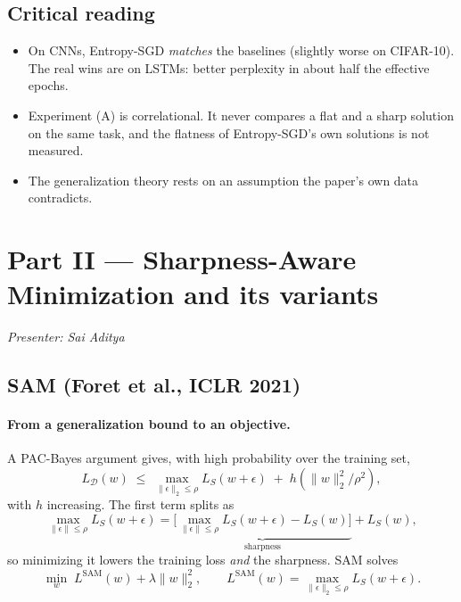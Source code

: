 \documentclass[11pt]{article}
\newcommand{\Ls}{L_S}                    %
\newcommand{\Ld}{L_{\mathcal{D}}}        %
\newcommand{\presenter}[1]{\noindent\textit{Presenter: #1}\par\medskip}
\theoremstyle{plain}
\begin{document}
\subsection{Critical reading}
\begin{itemize}
  \item On CNNs, Entropy-SGD \emph{matches} the baselines (slightly worse on CIFAR-10). The real wins are on LSTMs: better perplexity in about half the effective epochs.
  \item Experiment (A) is correlational. It never compares a flat and a sharp solution on the same task, and the flatness of Entropy-SGD's own solutions is not measured.
  \item The generalization theory rests on an assumption the paper's own data contradicts.
\end{itemize}

\section{Part II --- Sharpness-Aware Minimization and its variants}
\label{sec:sam}
\presenter{Sai Aditya}

\subsection{SAM (Foret et al., ICLR 2021)}

\paragraph{From a generalization bound to an objective.} A PAC-Bayes argument gives, with high probability over the training set,
\begin{equation}
  \Ld(w) \;\le\; \max_{\|\epsilon\|_2\le\rho} \Ls(w+\epsilon) \;+\; h\!\left(\|w\|_2^2/\rho^2\right),
\end{equation}
with $h$ increasing. The first term splits as
\begin{equation}
  \max_{\|\epsilon\|\le\rho} \Ls(w+\epsilon) = \underbrace{\Big[\max_{\|\epsilon\|\le\rho} \Ls(w+\epsilon) - \Ls(w)\Big]}_{\text{sharpness}} + \Ls(w),
\end{equation}
so minimizing it lowers the training loss \emph{and} the sharpness. SAM solves
\begin{equation}
  \min_w\; L^{\mathrm{SAM}}(w) + \lambda\|w\|_2^2, \qquad L^{\mathrm{SAM}}(w) = \max_{\|\epsilon\|_2\le\rho} \Ls(w+\epsilon).
\end{equation}
\end{document}
